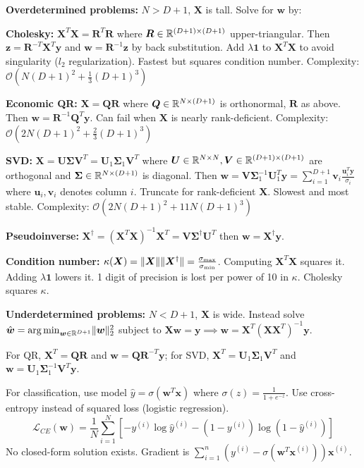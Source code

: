 \documentclass[twocolumn, 8pt]{extarticle}
\begin{document}
\textbf{Overdetermined problems:} \(N > D + 1\), \(\bm X\) is tall. Solve for \(\bm w\) by:

\textbf{Cholesky:} \(\bm X^T\bm X = \bm R^T\bm R\) where \(\bm R \in \mathbb{R}^{(D + 1) \times (D + 1)}\) upper-triangular.
Then \(\bm z = \bm R^{-T}\bm X^T\bm y\) and \(\bm w = \bm R^{-1}\bm z\) by back substitution. Add \(\lambda\bm 1\) to
\(\bm X^T\bm X\) to avoid singularity (\(l_2\) regularization).
Fastest but squares condition number. Complexity: \(\mathcal O(N(D + 1)^2 + \frac{1}{3}(D + 1)^3)\)

\textbf{Economic QR:} $\bm X = \bm Q\bm R$ where $\bm Q \in \mathbb{R}^{N \times (D + 1)}$ is orthonormal, \(\bm R\) as above.
Then \(\bm w = \bm R^{-1}\bm Q^T\bm y\). Can fail when \(\bm X\) is nearly rank-deficient.
Complexity: \(\mathcal O(2N(D + 1)^2 + \frac{2}{3}(D + 1)^3)\)

\textbf{SVD:} $\bm X = \bm U\bm\Sigma\bm V^T = \bm U_1\bm\Sigma_1\bm V^T$ where
$\bm U \in \mathbb{R}^{N \times N}, \bm V \in \mathbb{R}^{(D + 1) \times (D + 1)}$ are orthogonal and $\bm\Sigma \in \mathbb{R}^{N
\times (D + 1)}$ is diagonal.
Then \(\bm w = \bm V\bm\Sigma _1^{-1}\bm U_1^T\bm y = \sum _{i = 1}^{D + 1} \bm v_i\frac{\bm u_i^T\bm y}{\sigma _i}\)
where \(\bm u_i, \bm v_i\) denotes column \(i\). Truncate for rank-deficient \(\bm X\). Slowest and most stable.
Complexity: \(\mathcal O(2N(D + 1)^2 + 11N(D + 1)^3)\)

\textbf{Pseudoinverse:} \(\bm X^\dagger = (\bm X^T\bm X)^{-1}\bm X^T = \bm V\bm\Sigma^\dagger\bm U^T\) then \(\bm w= \bm
X^\dagger\bm y\).

\textbf{Condition number:} \(\kappa(\bm X) = \lVert\bm X\rVert\lVert\bm X^\dagger\rVert = \frac{\sigma _\text{max}}{\sigma
_\text{min}}\). Computing \(\bm X^T\bm X\) squares it. Adding \(\lambda\bm 1\) lowers it. 1 digit of precision is lost
per power of 10 in \(\kappa\). Cholesky squares \(\kappa\).

\textbf{Underdetermined problems:} \(N < D + 1\), \(\bm X\) is wide. Instead solve \(\hat{\bm w} = \operatorname*{arg\,min} _{\bm w \in
\mathbb{R}^{D + 1}} \lVert\bm w\rVert_2^2\) subject to \(\bm X\bm w = \bm y \implies \bm w = \bm X^T(\bm X\bm X^T)^{-1}\bm y\).

For QR, \(\bm X^T = \bm Q\bm R\) and \(\bm w = \bm Q\bm R^{-T}\bm y\); for SVD,
\(\bm X^T = \bm U_1\bm\Sigma _1\bm V^T\) and \(\bm w = \bm U_1\bm\Sigma _1^{-1}\bm V^T\bm y\).

For classification, use model \(\hat y = \sigma(\bm w^T\bm x)\) where \(\sigma(z) = \frac{1}{1 + e^{-z}}\).
Use cross-entropy instead of squared loss (logistic regression).
\[
    \mathcal L_{CE}(\bm w) = \frac{1}{N}\sum _{i = 1}^N \left[-y^{(i)}\log\hat y^{(i)} - (1 - y^{(i)})\log(1 - \hat y^{(i)})\right]
\]
No closed-form solution exists. Gradient is \(\sum _{i = 1}^n (y^{(i)} - \sigma(\bm w^T\bm x^{(i)}))\bm x^{(i)}\).
\end{document}
